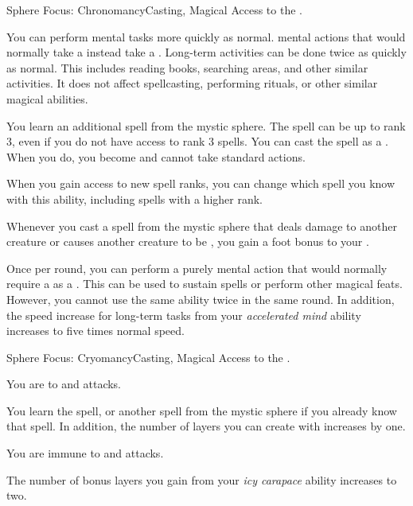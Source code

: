   \begin{magicalfeat}{Sphere Focus: Chronomancy}{Casting, Magical}
    \featpre Access to the  .

     You can perform mental tasks more quickly as normal.
     mental actions that would normally take a  instead take a .
    Long-term activities can be done twice as quickly as normal.
    This includes reading books, searching areas, and other similar activities.
    It does not affect spellcasting, performing rituals, or other similar magical abilities.

     You learn an additional spell from the  mystic sphere.
    The spell can be up to rank 3, even if you do not have access to rank 3 spells.
    You can cast the spell as a .
    When you do, you  become \slowed and cannot take standard actions.

    When you gain access to new spell ranks, you can change which spell you know with this ability, including spells with a higher rank.

     Whenever you cast a spell from the  mystic sphere that deals damage to another creature or causes another creature to be \slowed, you  gain a  foot bonus to your .

     Once per round, you can perform a purely mental action that would normally require a  as a .
    This can be used to sustain spells or perform other magical feats.
    However, you cannot use the same ability twice in the same round.
    In addition, the speed increase for long-term tasks from your \textit{accelerated mind} ability increases to five times normal speed.
  \end{magicalfeat}

  \begin{magicalfeat}{Sphere Focus: Cryomancy}{Casting, Magical}
    \featpre Access to the  .

     You are  to \atCold and \atPoison attacks.

     You learn the  spell, or another spell from the  mystic sphere if you already know that spell.
    In addition, the number of layers you can create with  increases by one.

     You are immune to \atCold and \atPoison attacks.

     The number of bonus layers you gain from your \textit{icy carapace} ability increases to two.
  \end{magicalfeat}

